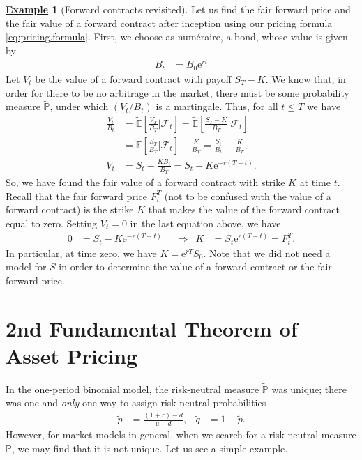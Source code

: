 \documentclass[12pt]{book}
\numberwithin{equation}{chapter}
\theoremstyle{plain}
\numberwithin{theorem}{section}
\theoremstyle{definition}
\newtheorem{example}[theorem]{\underline{Example}}
\numberwithin{exercise}{chapter}
\newcommand{\<}{\langle}
\renewcommand{\>}{\rangle}
\renewcommand{\(}{\left(}
\renewcommand{\)}{\right)}
\renewcommand{\[}{\left[}
\renewcommand{\]}{\right]}
\newcommand\Eb{\mathds{E}}
\newcommand\Pb{\mathds{P}}
\newcommand\Fc{\mathscr{F}}
\newcommand\Ebt{\widetilde{\Eb}}
\newcommand\Pbt{\widetilde{\Pb}}
\newcommand\qt{\widetilde{q}}
\newcommand\ee{\mathrm{e}}
\theoremstyle{definition}
\numberwithin{question}{section}
\newcommand\pt{\widetilde{p}}
\begin{document}
\begin{example}[Forward contracts revisited]
Let us find the fair forward price and the fair value of a forward contract after inception using our pricing formula \eqref{eq:pricing.formula}.
First, we choose as num\'eraire, a bond, whose value is given by
\begin{align}
B_t
	&=	B_0 \ee^{rt}
\end{align}
Let $V_t$ be the value of a forward contract with payoff $S_T - K$.  We know that, in order for there to be no arbitrage in the market, there must be some probability measure $\Pbt$, under which $(V_t/B_t)$ is a martingale.  Thus, for all $t \leq T$ we have
\begin{align}
\frac{V_t}{B_t}
	&=	\Ebt \[ \frac{V_T}{B_T} \Big| \Fc_t \]  
	 =	\Ebt \[ \frac{S_T-K}{B_T} \Big| \Fc_t \]  \\
	&=	\Ebt \[ \frac{S_T}{B_T} \Big| \Fc_t \] - \frac{K}{B_T} 
	 =	\frac{S_t}{B_t} - \frac{K}{B_T} , \\
V_t
	&=	S_t - \frac{K B_t}{B_T}  
	 =	S_t - K \ee^{-r(T-t)} .
\end{align}
So, we have found the fair value of a forward contract with strike $K$ at time $t$.  Recall that the fair forward price $F_t^T$ (not to be confused with the value of a forward contract) is the strike $K$ that makes the value of the forward contract equal to zero.  Setting $V_t = 0$ in the last equation above, we have
\begin{align}
0
	&=	S_t - K \ee^{-r(T-t)}  &
	&\Rightarrow&
K
	&=	S_t \ee^{r(T-t)} = F_t^T .
\end{align}
In particular, at time zero, we have $K = \ee^{rT}S_0$.  Note that we did not need a model for $S$ in order to determine the value of a forward contract or the fair forward price.
\end{example}






\section{2nd Fundamental Theorem of Asset Pricing}
In the one-period binomial model, the risk-neutral measure $\Pbt$ was unique; there was one and \textit{only} one way to assign risk-neutral probabilities
\begin{align}
\pt &= \frac{(1+r) - d}{u - d} , &
\qt &= 1-\pt .
\end{align}
However, for market models in general, when we search for a risk-neutral measure $\Pbt$, we may find that it is not unique.  Let us see a simple example.
\end{document}
